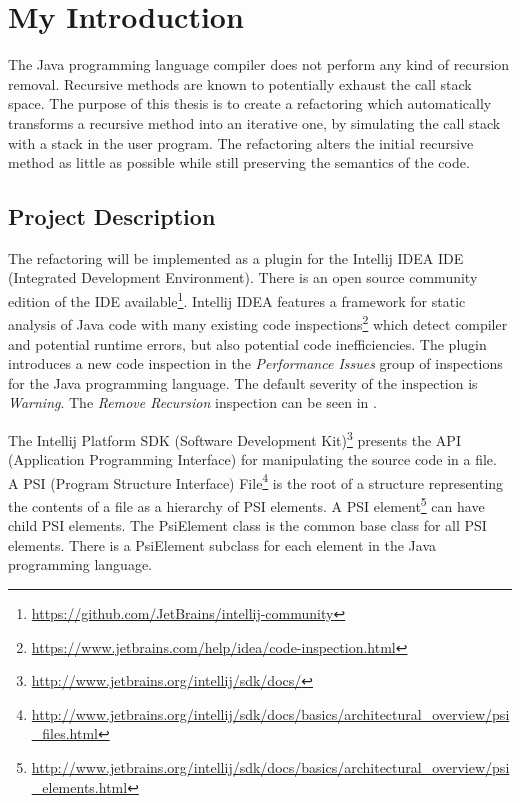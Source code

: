 \chapter{My Introduction}

The Java programming language compiler  does not perform any kind of recursion removal. Recursive methods
are known to potentially exhaust the call stack space. The purpose of this thesis is to create a refactoring which
automatically transforms a recursive method into an iterative one, by simulating the call stack with a stack in the user
program. The refactoring alters the initial recursive method as little as possible while still preserving the semantics
of the code.

\section{Project Description}

The refactoring will be implemented as a plugin for the Intellij IDEA IDE (Integrated Development Environment).
 There is an open source community edition of the IDE
available\footnote{\url{https://github.com/JetBrains/intellij-community}}. Intellij IDEA features a framework for
static analysis of Java code with many existing code
inspections\footnote{\url{https://www.jetbrains.com/help/idea/code-inspection.html}} which detect compiler and potential
runtime errors, but also potential code inefficiencies. The plugin introduces a new code inspection in the
\textit{Performance Issues} group of inspections for the Java programming language. The default severity of the inspection is
\textit{Warning}. The \textit{Remove Recursion} inspection can be seen in .

The Intellij Platform SDK (Software Development Kit)\footnote{\url{http://www.jetbrains.org/intellij/sdk/docs/}}
presents the API (Application Programming Interface) for manipulating
the source code in a file. A PSI (Program Structure Interface)
File\footnote{\url{http://www.jetbrains.org/intellij/sdk/docs/basics/architectural_overview/psi_files.html}} is the root
of a structure representing the contents of a file as a hierarchy of PSI elements. A PSI
element\footnote{\url{http://www.jetbrains.org/intellij/sdk/docs/basics/architectural_overview/psi_elements.html}} can
have child PSI elements. The PsiElement class is the common base class for all PSI elements. There is a PsiElement
subclass for each element in the Java programming language.

